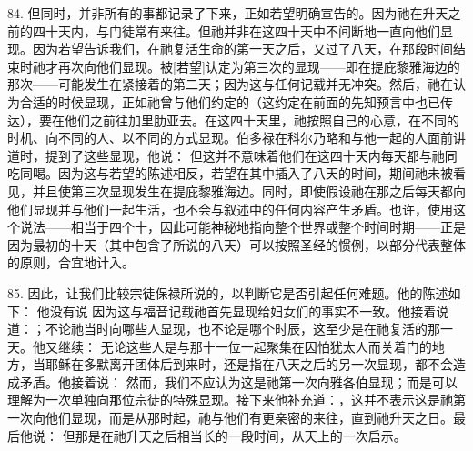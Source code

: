 84. 但同时，并非所有的事都记录了下来，正如若望明确宣告的。因为祂在升天之前的四十天内，与门徒常有来往。但祂并非在这四十天中不间断地一直向他们显现。因为若望告诉我们，在祂复活生命的第一天之后，又过了八天，在那段时间结束时祂才再次向他们显现。被[若望]认定为第三次的显现——即在提庇黎雅海边的那次——可能发生在紧接着的第二天；因为这与任何记载并无冲突。然后，祂在认为合适的时候显现，正如祂曾与他们约定的（这约定在前面的先知预言中也已传达），要在他们之前往加里肋亚去。在这四十天里，祂按照自己的心意，在不同的时机、向不同的人、以不同的方式显现。伯多禄在科尔乃略和与他一起的人面前讲道时，提到了这些显现，他说： 但这并不意味着他们在这四十天内每天都与祂同吃同喝。因为这与若望的陈述相反，若望在其中插入了八天的时间，期间祂未被看见，并且使第三次显现发生在提庇黎雅海边。同时，即使假设祂在那之后每天都向他们显现并与他们一起生活，也不会与叙述中的任何内容产生矛盾。也许，使用这个说法——相当于四个十，因此可能神秘地指向整个世界或整个时间时期——正是因为最初的十天（其中包含了所说的八天）可以按照圣经的惯例，以部分代表整体的原则，合宜地计入。\par

85. 因此，让我们比较宗徒保禄所说的，以判断它是否引起任何难题。他的陈述如下： 他没有说 因为这与福音记载祂首先显现给妇女们的事实不一致。他接着说道：；不论祂当时向哪些人显现，也不论是哪个时辰，这至少是在祂复活的那一天。他又继续： 无论这些人是与那十一位一起聚集在因怕犹太人而关着门的地方，当耶稣在多默离开团体后到来时，还是指在八天之后的另一次显现，都不会造成矛盾。他接着说： 然而，我们不应认为这是祂第一次向雅各伯显现；而是可以理解为一次单独向那位宗徒的特殊显现。接下来他补充道：，这并不表示这是祂第一次向他们显现，而是从那时起，祂与他们有更亲密的来往，直到祂升天之日。最后他说： 但那是在祂升天之后相当长的一段时间，从天上的一次启示。\par

